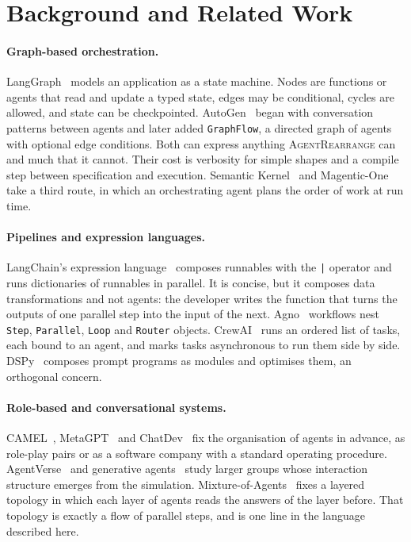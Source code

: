 \documentclass[11pt]{article}
\newcommand{\code}[1]{\texttt{#1}}
\newcommand{\AR}{\textsc{AgentRearrange}}
\begin{document}
\section{Background and Related Work}
\label{sec:related}

\paragraph{Graph-based orchestration.}
LangGraph~\cite{langgraph} models an application as a state machine. Nodes are functions or agents that read and update a typed state, edges may be conditional, cycles are allowed, and state can be checkpointed. AutoGen~\cite{autogen} began with conversation patterns between agents and later added \code{GraphFlow}, a directed graph of agents with optional edge conditions. Both can express anything \AR{} can and much that it cannot. Their cost is verbosity for simple shapes and a compile step between specification and execution. Semantic Kernel~\cite{semantic_kernel} and Magentic-One~\cite{magentic_one} take a third route, in which an orchestrating agent plans the order of work at run time.

\paragraph{Pipelines and expression languages.}
LangChain's expression language~\cite{langchain} composes runnables with the \code{|} operator and runs dictionaries of runnables in parallel. It is concise, but it composes data transformations and not agents: the developer writes the function that turns the outputs of one parallel step into the input of the next. Agno~\cite{agno} workflows nest \code{Step}, \code{Parallel}, \code{Loop} and \code{Router} objects. CrewAI~\cite{crewai} runs an ordered list of tasks, each bound to an agent, and marks tasks asynchronous to run them side by side. DSPy~\cite{dspy} composes prompt programs as modules and optimises them, an orthogonal concern.

\paragraph{Role-based and conversational systems.}
CAMEL~\cite{camel}, MetaGPT~\cite{metagpt} and ChatDev~\cite{chatdev} fix the organisation of agents in advance, as role-play pairs or as a software company with a standard operating procedure. AgentVerse~\cite{agentverse} and generative agents~\cite{generative_agents} study larger groups whose interaction structure emerges from the simulation. Mixture-of-Agents~\cite{moa} fixes a layered topology in which each layer of agents reads the answers of the layer before. That topology is exactly a flow of parallel steps, and is one line in the language described here.
\end{document}

